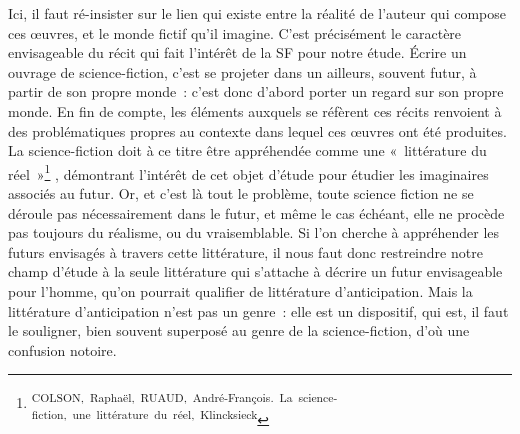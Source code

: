 \documentclass[letterpaper,portrait,12pt]{article}
\begin{document}
Ici, il faut r\'{e}-insister sur le lien qui existe entre la r\'{e}alit\'{e} de l'auteur qui compose ces \oe{}uvres, et le monde fictif qu'il imagine. C'est pr\'{e}cis\'{e}ment le caract\`{e}re envisageable du r\'{e}cit qui fait l'int\'{e}r\^{e}t de la SF pour notre \'{e}tude. \'{E}crire un ouvrage de science-fiction, c'est se projeter dans un ailleurs, souvent futur, \`{a} partir de son propre monde : c'est donc d'abord porter un regard sur son propre monde. En fin de compte, les \'{e}l\'{e}ments auxquels se r\'{e}f\`{e}rent ces r\'{e}cits renvoient \`{a} des probl\'{e}matiques propres au contexte dans lequel ces \oe{}uvres ont \'{e}t\'{e} produites. La science-fiction doit \`{a} ce titre \^{e}tre appr\'{e}hend\'{e}e comme une « litt\'{e}rature du r\'{e}el »\footnote{\textsuperscript{\newpage
}\textsuperscript{	COLSON,\ Rapha\"{e}l,\ RUAUD,\ Andr\'{e}-Fran\c{c}ois.\ La\ science-fiction,\ une\ litt\'{e}rature\ du\ r\'{e}el,\ Klincksieck}} , d\'{e}montrant l'int\'{e}r\^{e}t de cet objet d'\'{e}tude pour \'{e}tudier les imaginaires associ\'{e}s au futur. Or, et c'est l\`{a} tout le probl\`{e}me, toute science fiction ne se d\'{e}roule pas n\'{e}cessairement dans le futur, et m\^{e}me le cas \'{e}ch\'{e}ant, elle ne proc\`{e}de pas toujours du r\'{e}alisme, ou du vraisemblable. Si l'on cherche \`{a} appr\'{e}hender les futurs envisag\'{e}s \`{a} travers cette litt\'{e}rature, il nous faut donc restreindre notre champ d'\'{e}tude \`{a} la seule litt\'{e}rature qui s'attache \`{a} d\'{e}crire un futur envisageable pour l'homme, qu'on pourrait qualifier de litt\'{e}rature d'anticipation. Mais la litt\'{e}rature d'anticipation n'est pas un genre : elle est un dispositif, qui est, il faut le souligner, bien souvent superpos\'{e} au genre de la science-fiction, d'où une confusion notoire. 
\end{document}
